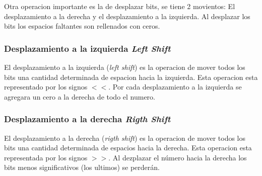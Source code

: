 Otra operacion importante es la de desplazar bits, se tiene 2 movientos: El desplazamiento a la
derecha y el desplazamiento a la izquierda. Al desplazar los bits los espacios faltantes son rellenados
con ceros.

\subsubsection{Desplazamiento a la izquierda \emph{Left Shift}}

El desplazamiento a la izquierda (\emph{left shift}) es la operacion de mover todos los bits una cantidad
determinada de espacion hacia la izquierda. Esta operacion esta representado por los signos $<<$.
Por cada desplazamiento a la izquierda se agregara un cero a la derecha de todo el numero.

\subsubsection{Desplazamiento a la derecha \emph{Rigth Shift}}

El desplazamiento a la derecha (\emph{rigth shift}) es la operacion de mover todos los bits una cantidad
determinada de espacios hacia la derecha. Esta operacion esta representada por los signos $>>$. Al dezplazar el número hacia la derecha los bits menos significativos (los ultimos) se perderán.